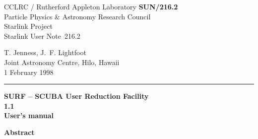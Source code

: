 \documentclass[twoside,11pt]{article}
\newcommand{\stardoccategory}  {Starlink User Note}
\newcommand{\stardocinitials}  {SUN}
\newcommand{\stardocnumber}    {216.2}
\newcommand{\stardocauthors}   {T. Jenness, J.~F. Lightfoot\\
                                Joint Astronomy Centre, Hilo, Hawaii}
\newcommand{\stardocdate}      {1 February 1998}
\newcommand{\stardoctitle}     {SURF -- SCUBA User Reduction Facility}
\newcommand{\stardocversion}   {1.1}
\newcommand{\stardocmanual}    {User's manual}
\newcommand{\stardocname}{\stardocinitials /\stardocnumber}
\newenvironment{latexonly}{}{}
\begin{document}
\thispagestyle{empty}

\begin{latexonly}
   CCLRC / {\sc Rutherford Appleton Laboratory} \hfill {\bf \stardocname}\\
   {\large Particle Physics \& Astronomy Research Council}\\
   {\large Starlink Project\\}
   {\large \stardoccategory\ \stardocnumber}
   \begin{flushright}
   \stardocauthors\\
   \stardocdate
   \end{flushright}
   \vspace{-4mm}
   \rule{\textwidth}{0.5mm}
   \vspace{5mm}
   \begin{center}

   {\Huge\bf  \stardoctitle \\ [2.5ex]}
   {\LARGE\bf \stardocversion \\ [4ex]}
   {\Huge\bf  \stardocmanual}
   \end{center}
   \vspace{5mm}

   \vspace{10mm}
   \begin{center}
      {\Large\bf Abstract}
   \end{center}
\end{latexonly}
\end{document}
